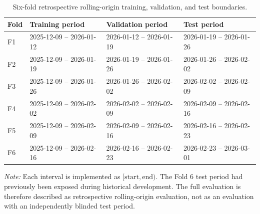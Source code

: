 \documentclass[pdflatex,sn-mathphys-num,iicol]{sn-jnl}
\begin{document}

\begin{table}[!t]
\caption{Six-fold retrospective rolling-origin training, validation, and test boundaries.}
\label{tab:rolling-origin-folds}
\centering

\renewcommand{\arraystretch}{1.15}

\begin{tabular}{
|p{}
|p{}
|p{}
|p{}|
}
\hline

\textbf{Fold}
&
\textbf{Training period}
&
\textbf{Validation period}
&
\textbf{Test period}
\\
\hline

F1
&
2025-12-09 -- 2026-01-12
&
2026-01-12 -- 2026-01-19
&
2026-01-19 -- 2026-01-26
\\
\hline

F2
&
2025-12-09 -- 2026-01-19
&
2026-01-19 -- 2026-01-26
&
2026-01-26 -- 2026-02-02
\\
\hline

F3
&
2025-12-09 -- 2026-01-26
&
2026-01-26 -- 2026-02-02
&
2026-02-02 -- 2026-02-09
\\
\hline

F4
&
2025-12-09 -- 2026-02-02
&
2026-02-02 -- 2026-02-09
&
2026-02-09 -- 2026-02-16
\\
\hline

F5
&
2025-12-09 -- 2026-02-09
&
2026-02-09 -- 2026-02-16
&
2026-02-16 -- 2026-02-23
\\
\hline

F6
&
2025-12-09 -- 2026-02-16
&
2026-02-16 -- 2026-02-23
&
2026-02-23 -- 2026-03-01
\\
\hline

\end{tabular}

\vspace{2mm}

\begin{flushleft}
\footnotesize
\textit{Note:} Each interval is implemented as $[\mathrm{start},\mathrm{end})$. The Fold 6 test period had previously been exposed during historical development. The full evaluation is therefore described as retrospective rolling-origin evaluation, not as an evaluation with an independently blinded test period.
\end{flushleft}

\end{table}
\end{document}
